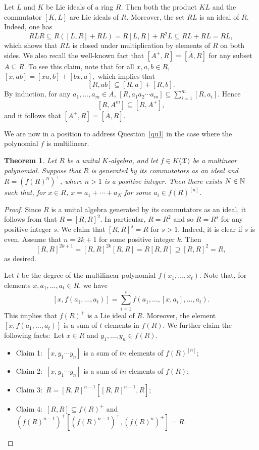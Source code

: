 \documentclass[11pt]{article}
\newtheorem{theorem}{Theorem}
\theoremstyle{definition}
\begin{document}
{{{{			Let $L$ and $K$ be Lie ideals of a ring $R$. Then both the product $KL$ and the commutator $[K,L]$ are Lie ideals of $R$. Moreover, the set $RL$ is an ideal of $R$. Indeed, one has
			\[
			RLR \subseteq R([L,R] + RL)=R[L,R] + R^2L \subseteq RL + RL = RL,
			\]
			which shows that $RL$ is closed under multiplication by elements of $R$ on both sides. We also recall the well-known fact that $[A^+, R] = [\overline{A}, R]$ for any subset $A \subseteq R$. To see this claim, note that for all $x,a,b \in R$,
			$
			[x,ab] = [xa,b] + [bx,a],
			$
			which implies that $$[R,ab] \subseteq [R,a] + [R,b].$$ By induction, for any $a_1,\dots,a_m \in A$,
			$\displaystyle
			[R, a_1 a_2 \cdots a_m] \subseteq \sum_{i=1}^m [R,a_i].
			$
			Hence $$[R, A^m] \subseteq [R, A^+],$$ and it follows that $[A^+, R] = [\overline{A}, R]$.
			
			We are now in a position to address Question~\ref{qu1} in the case where the polynomial $f$ is multilinear.
				
				\begin{theorem}\label{thm76}
					Let $R$ be a unital $K$-algebra, and let $f \in K\langle \mathcal{X} \rangle$ be a multinear polynomial.
					Suppose that $R$ is generated by its commutators as an ideal and $R=(f(R)^n)^+$, where $n>1$ is a positive integer. Then there exists $N\in \Bbb N$ such that, for $x\in R$,
					$x=a_1+\cdots+a_N$ for some $a_i\in f(R)^{[n]}$.
				\end{theorem}
				
				\begin{proof}
					Since $R$ is a unital algebra generated by its commutators as an ideal, it follows from \cite[Theorem 3.10]{calugareanu2026} that $R=[R, R]^2$.
					In particular, $R=R^2$ and so $R=R^s$ for any positive integer $s$. We claim that $[R, R]^s=R$ for $s>1$.
					Indeed, it is clear if $s$ is even. Assume that $n=2k+1$ for some positive integer $k$. Then
					$$
					[R, R]^{2k+1}=[R, R]^{2k}[R, R]=R[R, R]\supseteq [R, R]^2=R,
					$$
					as desired.
					
					Let $t$ be the degree of the multilinear polynomial $f(x_1,\ldots,x_t)$.
					Note that, for elements $x, a_1,\ldots,a_t\in R$, we have
					\begin{equation}\label{eq:1}
						[x, f(a_1,\ldots,a_t)]=\sum_{i=1}^t f(a_1,\ldots,[x, a_i],\ldots,a_t).
					\end{equation}
					This implies that $f(R)^+$ is a Lie ideal of $R$. Moreover, the element $[x, f(a_1,\ldots,a_t)]$ is a sum of $t$ elements in $f(R)$.
					We further claim the following facts:\ Let $x\in R$ and $y_1,\ldots,y_n\in f(R)$.
					\begin{itemize}
						\item Claim 1:\ $[x, y_1\cdots y_n]$ is a sum of $tn$ elements of $f(R)^{[n]}$;\vskip4pt
						\item Claim 2:\ $[x, y_1\cdots y_n]$ is a sum of $tn$ elements of $f(R)$;\vskip4pt
						\item Claim 3:\ $R=[R, R]^{n-1}[[R, R]^{n-1}, R]$;\vskip4pt
						\item Claim 4:\ $[R, R]\subseteq f(R)^+$ and $(f(R)^{n-1})^+[(f(R)^{n-1})^+, (f(R)^n)^+]=R$.\vskip4pt
					\end{itemize}
					

\end{proof}}}}}
\end{document}
